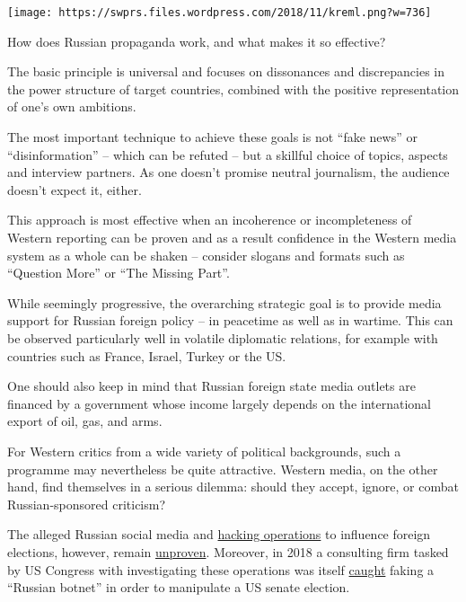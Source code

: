 \texttt{[image: https://swprs.files.wordpress.com/2018/11/kreml.png?w=736]}

How does Russian propaganda work, and what makes it so effective?

The basic principle is universal and focuses on dissonances and
discrepancies in the power structure of target countries, combined with
the positive representation of one's own ambitions.

The most important technique to achieve these goals is not ``fake news''
or ``disinformation'' -- which can be refuted -- but a skillful choice
of topics, aspects and interview partners. As one doesn't promise
neutral journalism, the audience doesn't expect it, either.

This approach is most effective when an incoherence or incompleteness of
Western reporting can be proven and as a result confidence in the
Western media system as a whole can be shaken -- consider slogans and
formats such as ``Question More'' or ``The Missing Part''.

While seemingly progressive, the overarching strategic goal is to
provide media support for Russian foreign policy -- in peacetime as well
as in wartime. This can be observed particularly well in volatile
diplomatic relations, for example with countries such as France, Israel,
Turkey or the US.

One should also keep in mind that Russian foreign state media outlets
are financed by a government whose income largely depends on the
international export of oil, gas, and arms.

For Western critics from a wide variety of political backgrounds, such a
programme may nevertheless be quite attractive. Western media, on the
other hand, find themselves in a serious dilemma: should they accept,
ignore, or combat Russian-sponsored criticism?

The alleged Russian social media and
\href{https://consortiumnews.com/2018/08/13/too-big-to-fail-russia-gate-one-year-after-vips-showed-a-leak-not-a-hack/}{hacking
operations} to influence foreign elections, however, remain
\href{https://www.thenation.com/article/russiagate-elections-interference/}{unproven}.
Moreover, in 2018 a consulting firm tasked by US Congress with
investigating these operations was itself
\href{https://thegrayzone.com/2018/12/25/senate-report-on-russian-interference-was-written-by-disinformation-warriors-behind-alabama-false-flag-operation/}{caught}
faking a ``Russian botnet'' in order to manipulate a US senate election.

